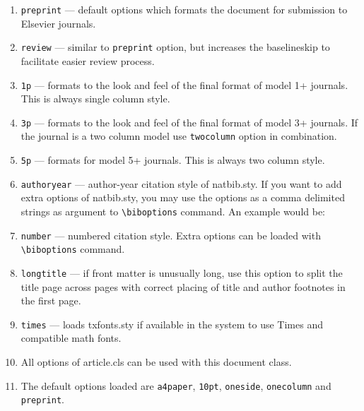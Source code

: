 \documentclass[a4paper,12pt]{article}
\def\file#1{\textsf{#1}\xspace}
\begin{document}
\begin{enumerate}[(1)]

\item \verb+preprint+ --- default options which formats the
  document for submission to Elsevier journals.

\item \verb+review+ --- similar to \verb+preprint+ option, but
  increases the baselineskip to facilitate easier review process.

\item \verb+1p+ --- formats to the look and feel of the final
  format of model 1+ journals. This is always single column style.

\item \verb+3p+ --- formats to the look and feel of the final
  format of model 3+ journals. If the journal is a two column
model use \verb+twocolumn+ option in combination.

\item \verb+5p+ --- formats for model 5+ journals. This is always
  two column style.

\item \verb+authoryear+ --- author-year citation style of
  \file{natbib.sty}. If you want to add extra options of
\file{natbib.sty}, you may use the options as a comma delimited
strings as argument to \verb+\biboptions+ command. An example
would be:
\end{enumerate}
\begin{vquote}
\end{vquote}

\begin{enumerate}[(1)] \setcounter{enumi}{6}
\item \verb+number+ --- numbered citation style. Extra options
  can be loaded with \verb+\biboptions+ command.

\item \verb+longtitle+ --- if front matter is unusually long, use
  this option to split the title page across pages with correct
placing of title and author footnotes in the first page.

\item \verb+times+ --- loads \file{txfonts.sty} if available in
  the system to use Times and compatible math fonts.

\item All options of \file{article.cls} can be used with this
  document class.

\item The default options loaded are \verb+a4paper+, \verb+10pt+,
  \verb+oneside+, \verb+onecolumn+ and \verb+preprint+.

\end{enumerate}
\end{document}
